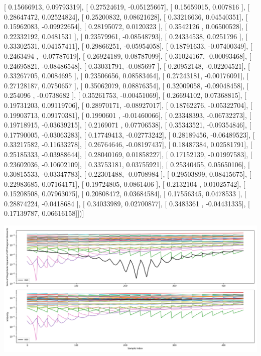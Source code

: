 \documentclass{article}
\begin{document}
       [ 0.15666913,  0.09793319],
       [ 0.27524619, -0.05125667],
       [ 0.15659015,  0.007816  ],
       [ 0.28647472,  0.02524824],
       [ 0.25200832,  0.08621628],
       [ 0.33216636,  0.04540351],
       [ 0.15962083, -0.09922654],
       [ 0.28195072,  0.0120323 ],
       [ 0.3542126 ,  0.06500528],
       [ 0.22332192,  0.0481531 ],
       [ 0.23579961, -0.08548793],
       [ 0.24334538,  0.0251796 ],
       [ 0.33302531,  0.04157411],
       [ 0.29866251, -0.05954058],
       [ 0.18791633, -0.07400349],
       [ 0.2463494 , -0.07787619],
       [ 0.26924189,  0.08787099],
       [ 0.31024167, -0.00093468],
       [ 0.24695821, -0.08486548],
       [ 0.33031791, -0.085697  ],
       [ 0.20952148, -0.02204521],
       [ 0.33267705,  0.0084695 ],
       [ 0.23506656,  0.08583464],
       [ 0.27243181, -0.00176091],
       [ 0.27128187,  0.0750657 ],
       [ 0.35062079,  0.08876354],
       [ 0.32009058, -0.09048458],
       [ 0.254096  , -0.0738682 ],
       [ 0.35261753, -0.00451069],
       [ 0.26694102,  0.07368815],
       [ 0.19731203,  0.09119706],
       [ 0.28970171, -0.08927017],
       [ 0.18762276, -0.05322704],
       [ 0.19903713,  0.09170381],
       [ 0.1990601 , -0.01460066],
       [ 0.23348393, -0.06732273],
       [ 0.19718915, -0.03639215],
       [ 0.2169071 ,  0.07706538],
       [ 0.35343521, -0.09354846],
       [ 0.17790005, -0.03063283],
       [ 0.17749413, -0.02773242],
       [ 0.28189456, -0.06489523],
       [ 0.33217582, -0.11633278],
       [ 0.26764646, -0.08197437],
       [ 0.18487384,  0.02581791],
       [ 0.25185333, -0.03988644],
       [ 0.28040169,  0.01858227],
       [ 0.17152139, -0.01997583],
       [ 0.23602036, -0.10602109],
       [ 0.33753181,  0.03755921],
       [ 0.25340455,  0.05650106],
       [ 0.30815533, -0.03347783],
       [ 0.22301488, -0.0708984 ],
       [ 0.29503899,  0.08415675],
       [ 0.22983685,  0.07164171],
       [ 0.19724805,  0.0861406 ],
       [ 0.2132104 ,  0.01025742],
       [ 0.15208508,  0.07963075],
       [ 0.20808472,  0.03684584],
       [ 0.17556345,  0.0478533 ],
       [ 0.28874224, -0.0418684 ],
       [ 0.34033989,  0.02700877],
       [ 0.3483361 , -0.04431335],
       [ 0.17139787,  0.06616158]])]
\begin{center}
\includegraphics[scale=.9]{report_pickled_controls245/control_dpn_all.png}

\end{center}
\end{document}
